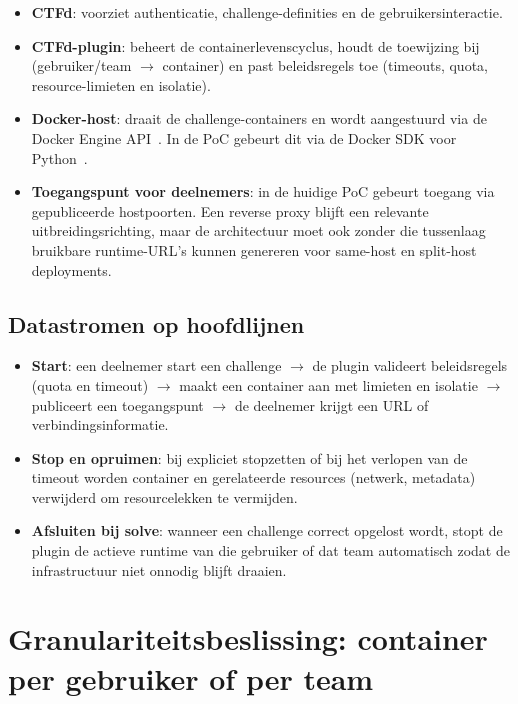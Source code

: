 \begin{itemize}
  \item \textbf{CTFd}: voorziet authenticatie, challenge-definities en de gebruikersinteractie.
  \item \textbf{CTFd-plugin}: beheert de containerlevenscyclus, houdt de toewijzing bij (gebruiker/team $\rightarrow$ container) en past beleidsregels toe (timeouts, quota, resource-limieten en isolatie).
  \item \textbf{Docker-host}: draait de challenge-containers en wordt aangestuurd via de Docker Engine API~\autocite{DockerEngineAPI}. In de PoC gebeurt dit via de Docker SDK voor Python~\autocite{DockerSDKPython}.
  \item \textbf{Toegangspunt voor deelnemers}: in de huidige PoC gebeurt toegang via gepubliceerde hostpoorten. Een reverse proxy blijft een relevante uitbreidingsrichting, maar de architectuur moet ook zonder die tussenlaag bruikbare runtime-URL's kunnen genereren voor same-host en split-host deployments.
\end{itemize}

\subsection{Datastromen op hoofdlijnen}

\begin{itemize}
  \item \textbf{Start}: een deelnemer start een challenge $\rightarrow$ de plugin valideert beleidsregels (quota en timeout) $\rightarrow$ maakt een container aan met limieten en isolatie $\rightarrow$ publiceert een toegangspunt $\rightarrow$ de deelnemer krijgt een URL of verbindingsinformatie.
  \item \textbf{Stop en opruimen}: bij expliciet stopzetten of bij het verlopen van de timeout worden container en gerelateerde resources (netwerk, metadata) verwijderd om resourcelekken te vermijden.
  \item \textbf{Afsluiten bij solve}: wanneer een challenge correct opgelost wordt, stopt de plugin de actieve runtime van die gebruiker of dat team automatisch zodat de infrastructuur niet onnodig blijft draaien.
\end{itemize}

\section{Granulariteitsbeslissing: container per gebruiker of per team}%
\label{sec:tobe-granulariteit}

